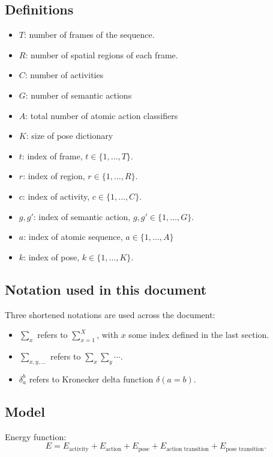 \documentclass[10pt,letterpaper]{article}
\newcommand{\+}[1]{\ensuremath{{\boldsymbol #1}}}
\begin{document}
\subsection*{Definitions}
\begin{itemize}
\item $T$: number of frames of the sequence.
\item $R$: number of spatial regions of each frame.
\item $C$: number of activities
\item $G$: number of semantic actions
\item $A$: total number of atomic action classifiers
\item $K$: size of pose dictionary
\item $t$: index of frame, $t \in \{1,\dots,T\}$.
\item $r$: index of region, $r \in \{1,\dots,R\}$.
\item $c$: index of activity, $c \in \{1,\dots,C\}$.
\item $g,g'$: index of semantic action, $g,g' \in \{1,\dots,G\}$.
\item $a$: index of atomic sequence, $a \in \{1,\dots,A\}$
\item $k$: index of pose, $k \in \{1,\dots,K\}$.
\end{itemize}

\subsection*{Notation used in this document}
Three shortened notations are used across the document:
\begin{itemize}
\item $\sum_x$ refers to $\sum_{x=1}^X$, with $x$ some index defined in the last section.
\item $\sum_{x,y,...}$ refers to $\sum_x \sum_y \cdots$.
\item $\delta_a^b$ refers to Kronecker delta function $\delta(a = b)$.
\end{itemize}


\subsection{Model}

Energy function:
\begin{equation}
E = E_{\text{activity}} + E_{\text{action}} + E_{\text{pose}}
  + E_{\text{action transition}} + E_{\text{pose transition}}.
\end{equation}
\end{document}
